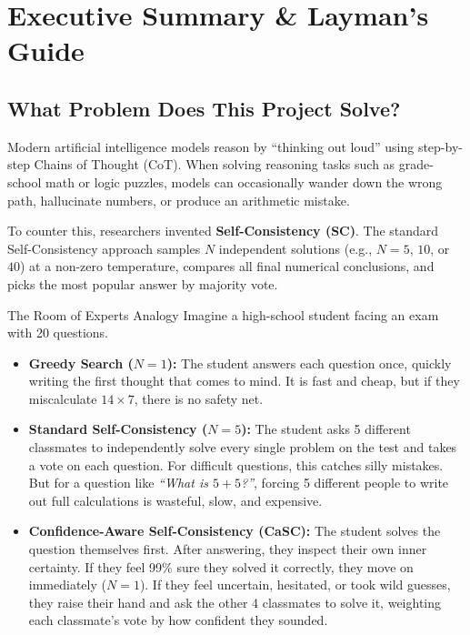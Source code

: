 \documentclass[11pt,a4paper]{article}
\begin{document}
\section{Executive Summary \& Layman's Guide}

\subsection{What Problem Does This Project Solve?}
Modern artificial intelligence models reason by ``thinking out loud'' using step-by-step Chains of Thought (CoT). When solving reasoning tasks such as grade-school math or logic puzzles, models can occasionally wander down the wrong path, hallucinate numbers, or produce an arithmetic mistake.

To counter this, researchers invented \textbf{Self-Consistency (SC)}. The standard Self-Consistency approach samples $N$ independent solutions (e.g., $N=5$, $10$, or $40$) at a non-zero temperature, compares all final numerical conclusions, and picks the most popular answer by majority vote. 

\begin{laymanbox}{The Room of Experts Analogy}
Imagine a high-school student facing an exam with 20 questions. 
\begin{itemize}[leftmargin=*]
    \item \textbf{Greedy Search ($N=1$):} The student answers each question once, quickly writing the first thought that comes to mind. It is fast and cheap, but if they miscalculate $14 \times 7$, there is no safety net.
    \item \textbf{Standard Self-Consistency ($N=5$):} The student asks 5 different classmates to independently solve every single problem on the test and takes a vote on each question. For difficult questions, this catches silly mistakes. But for a question like \textit{``What is $5 + 5$?''}, forcing 5 different people to write out full calculations is wasteful, slow, and expensive.
    \item \textbf{Confidence-Aware Self-Consistency (CaSC):} The student solves the question themselves first. After answering, they inspect their own inner certainty. If they feel 99\% sure they solved it correctly, they move on immediately ($N=1$). If they feel uncertain, hesitated, or took wild guesses, they raise their hand and ask the other 4 classmates to solve it, weighting each classmate's vote by how confident they sounded.
\end{itemize}
\end{laymanbox}
\end{document}

